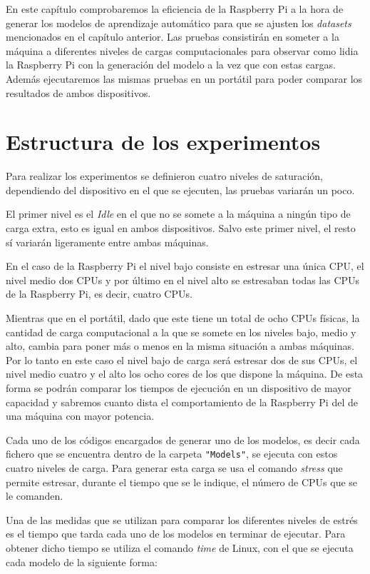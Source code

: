 \documentclass[a4paper, 12pt]{book}
\begin{document}
En este capítulo comprobaremos la eficiencia de la Raspberry Pi a la hora de generar los modelos de aprendizaje automático para que se ajusten los \textit{datasets} mencionados en el capítulo anterior. Las pruebas consistirán en someter a la máquina a diferentes niveles de cargas computacionales para observar como lidia la Raspberry Pi con la generación del modelo a la vez que con estas cargas.
Además ejecutaremos las mismas pruebas en un portátil para poder comparar los resultados de ambos dispositivos.

\section{Estructura de los experimentos}
\label{sec:estructura_experimentos}

Para realizar los experimentos se definieron cuatro niveles de saturación, dependiendo del dispositivo en el que se ejecuten, las pruebas variarán un poco. 

El primer nivel es el \textit{Idle} en el que no se somete a la máquina a ningún tipo de carga extra, esto es igual en ambos dispositivos. Salvo este primer nivel, el resto sí variarán ligeramente entre ambas máquinas.

En el caso de la Raspberry Pi el nivel bajo consiste en estresar una única CPU, el nivel medio dos CPUs y por último en el nivel alto se estresaban todas las CPUs de la Raspberry Pi, es decir, cuatro CPUs. 

Mientras que en el portátil, dado que este tiene un total de ocho CPUs físicas, la cantidad de carga computacional a la que se somete en los niveles bajo, medio y alto, cambia para poner más o menos en la misma situación a ambas máquinas. Por lo tanto en este caso el nivel bajo de carga será estresar dos de sus CPUs, el nivel medio cuatro y el alto los ocho cores de los que dispone la máquina. De esta forma se podrán comparar los tiempos de ejecución en un dispositivo de mayor capacidad y sabremos cuanto dista el comportamiento de la Raspberry Pi del de una máquina con mayor potencia.

Cada uno de los códigos encargados de generar uno de los modelos, es decir cada fichero que se encuentra dentro de la carpeta \texttt{"Models"}, se ejecuta con estos cuatro niveles de carga. Para generar esta carga se usa el comando \textit{stress} que permite estresar, durante el tiempo que se le indique, el número de CPUs que se le comanden. 

Una de las medidas que se utilizan para comparar los diferentes niveles de estrés es el tiempo que tarda cada uno de los modelos en terminar de ejecutar. Para obtener dicho tiempo se utiliza el comando \textit{time} de Linux, con el que se ejecuta cada modelo de la siguiente forma:\\
\end{document}
